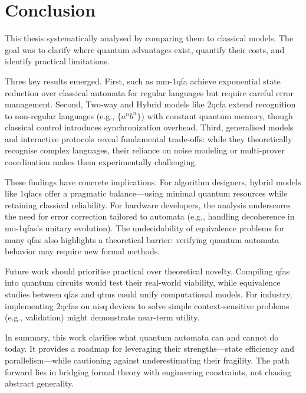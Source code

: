 \chapter{Conclusion}
\label{chap:conclusion}

This thesis systematically analysed  by comparing them to classical models. The goal was to clarify where quantum advantages exist, quantify their costs, and identify practical limitations.

Three key results emerged. First,  such as %
\gls{mm-1qfa} achieve exponential state reduction over classical automata for regular languages but require careful error management. Second, Two-way and Hybrid models like \gls{2qcfa} extend recognition to non-regular languages (e.g., $\{a^n b^n\}$) with constant quantum memory, though classical control introduces synchronization overhead. Third, generalised models and interactive protocols reveal fundamental trade-offs: while they theoretically recognise complex languages, their reliance on noise modeling or multi-prover coordination makes them experimentally challenging.

These findings have concrete implications. For algorithm designers, hybrid models like \glspl{1qfac} offer a pragmatic balance—using minimal quantum resources while retaining classical reliability. For hardware developers, the analysis underscores the need for error correction tailored to automata (e.g., handling decoherence in \glspl{mo-1qfa}'s unitary evolution). The undecidability of equivalence problems for many \glspl{qfa} also highlights a theoretical barrier: verifying quantum automata behavior may require new formal methods.

Future work should prioritise practical over theoretical novelty. Compiling \glspl{qfa} into quantum circuits would test their real-world viability, while equivalence studies between \glspl{qfa} and \glspl{qtm} could unify computational models. For industry, implementing \glspl{2qcfa} on \gls{nisq} devices to solve simple context-sensitive problems (e.g.,  validation) might demonstrate near-term utility.

In summary, this work clarifies what quantum automata can and cannot do today. It provides a roadmap for leveraging their strengths—state efficiency and parallelism—while cautioning against underestimating their fragility. The path forward lies in bridging formal theory with engineering constraints, not chasing abstract generality.